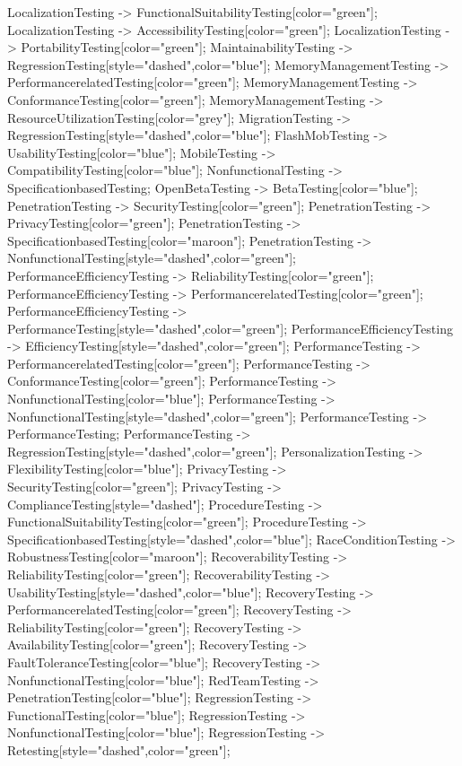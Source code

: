 \documentclass{article}
\begin{document}
{LocalizationTesting -> FunctionalSuitabilityTesting[color="green"];
LocalizationTesting -> AccessibilityTesting[color="green"];
LocalizationTesting -> PortabilityTesting[color="green"];
MaintainabilityTesting -> RegressionTesting[style="dashed",color="blue"];
MemoryManagementTesting -> PerformancerelatedTesting[color="green"];
MemoryManagementTesting -> ConformanceTesting[color="green"];
MemoryManagementTesting -> ResourceUtilizationTesting[color="grey"];
MigrationTesting -> RegressionTesting[style="dashed",color="blue"];
FlashMobTesting -> UsabilityTesting[color="blue"];
MobileTesting -> CompatibilityTesting[color="blue"];
NonfunctionalTesting -> SpecificationbasedTesting;
OpenBetaTesting -> BetaTesting[color="blue"];
PenetrationTesting -> SecurityTesting[color="green"];
PenetrationTesting -> PrivacyTesting[color="green"];
PenetrationTesting -> SpecificationbasedTesting[color="maroon"];
PenetrationTesting -> NonfunctionalTesting[style="dashed",color="green"];
PerformanceEfficiencyTesting -> ReliabilityTesting[color="green"];
PerformanceEfficiencyTesting -> PerformancerelatedTesting[color="green"];
PerformanceEfficiencyTesting -> PerformanceTesting[style="dashed",color="green"];
PerformanceEfficiencyTesting -> EfficiencyTesting[style="dashed",color="green"];
PerformanceTesting -> PerformancerelatedTesting[color="green"];
PerformanceTesting -> ConformanceTesting[color="green"];
PerformanceTesting -> NonfunctionalTesting[color="blue"];
PerformanceTesting -> NonfunctionalTesting[style="dashed",color="green"];
PerformanceTesting -> PerformanceTesting;
PerformanceTesting -> RegressionTesting[style="dashed",color="green"];
PersonalizationTesting -> FlexibilityTesting[color="blue"];
PrivacyTesting -> SecurityTesting[color="green"];
PrivacyTesting -> ComplianceTesting[style="dashed"];
ProcedureTesting -> FunctionalSuitabilityTesting[color="green"];
ProcedureTesting -> SpecificationbasedTesting[style="dashed",color="blue"];
RaceConditionTesting -> RobustnessTesting[color="maroon"];
RecoverabilityTesting -> ReliabilityTesting[color="green"];
RecoverabilityTesting -> UsabilityTesting[style="dashed",color="blue"];
RecoveryTesting -> PerformancerelatedTesting[color="green"];
RecoveryTesting -> ReliabilityTesting[color="green"];
RecoveryTesting -> AvailabilityTesting[color="green"];
RecoveryTesting -> FaultToleranceTesting[color="blue"];
RecoveryTesting -> NonfunctionalTesting[color="blue"];
RedTeamTesting -> PenetrationTesting[color="blue"];
RegressionTesting -> FunctionalTesting[color="blue"];
RegressionTesting -> NonfunctionalTesting[color="blue"];
RegressionTesting -> Retesting[style="dashed",color="green"];
}
\end{document}
